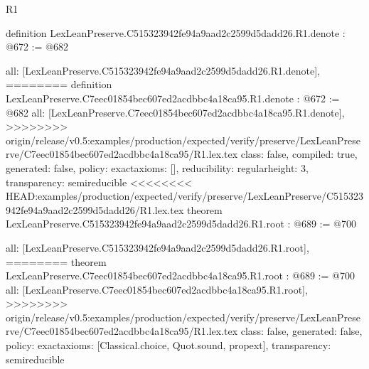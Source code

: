 \begin{lexlean}{R1}
\begin{coremodule}
{{{{{{definition LexLeanPreserve.C515323942fe94a9aad2c2599d5dadd26.R1.denote : @672 := @682 {
  all: [LexLeanPreserve.C515323942fe94a9aad2c2599d5dadd26.R1.denote],
========
definition LexLeanPreserve.C7eec01854bec607ed2acdbbc4a18ca95.R1.denote : @672 := @682 {
  all: [LexLeanPreserve.C7eec01854bec607ed2acdbbc4a18ca95.R1.denote],
>>>>>>>> origin/release/v0.5:examples/production/expected/verify/preserve/LexLeanPreserve/C7eec01854bec607ed2acdbbc4a18ca95/R1.lex.tex
  class: false,
  compiled: true,
  generated: false,
  policy: exact{axioms: []},
  reducibility: regular{height: 3},
  transparency: semireducible
}
<<<<<<<< HEAD:examples/production/expected/verify/preserve/LexLeanPreserve/C515323942fe94a9aad2c2599d5dadd26/R1.lex.tex
theorem LexLeanPreserve.C515323942fe94a9aad2c2599d5dadd26.R1.root : @689 := @700 {
  all: [LexLeanPreserve.C515323942fe94a9aad2c2599d5dadd26.R1.root],
========
theorem LexLeanPreserve.C7eec01854bec607ed2acdbbc4a18ca95.R1.root : @689 := @700 {
  all: [LexLeanPreserve.C7eec01854bec607ed2acdbbc4a18ca95.R1.root],
>>>>>>>> origin/release/v0.5:examples/production/expected/verify/preserve/LexLeanPreserve/C7eec01854bec607ed2acdbbc4a18ca95/R1.lex.tex
  class: false,
  generated: false,
  policy: exact{axioms: [Classical.choice, Quot.sound, propext]},
  transparency: semireducible
}

}}}}}}}}
\end{coremodule}
\end{lexlean}
